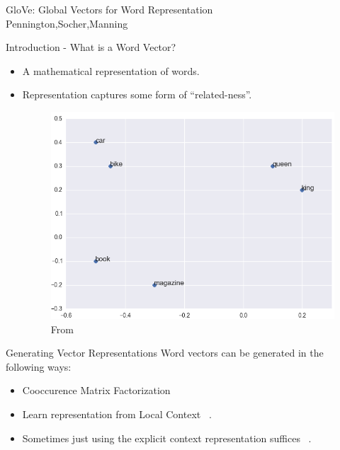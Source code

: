 \begin{frame}
  \begin{center}
    {
      \huge GloVe: Global Vectors for Word Representation
    } \\
    Pennington,Socher,Manning
  \end{center}
\end{frame}

\begin{frame}{Introduction - What is a Word Vector?}
  \begin{itemize}
  \item A mathematical representation of words.
  \item Representation captures some form of ``related-ness''.
    \begin{figure}
      \includegraphics[scale=0.35]{images/wordvec.png}
      \caption{From}
    \end{figure}    
  \end{itemize}
\end{frame}


\begin{frame}{Generating Vector Representations}
  Word vectors can be generated in the following ways:
  \begin{itemize}[<+->]
  \item Cooccurence Matrix Factorization~\cite{Deerwester} %
  \item Learn representation from Local Context ~\cite{Mikolov13a}.%
  \item Sometimes just using the explicit context representation suffices ~\cite{Levy14}.
  \end{itemize}
\end{frame}

